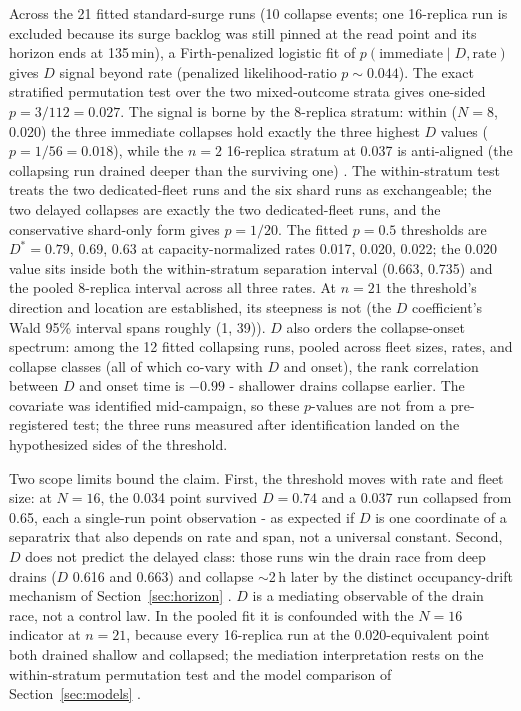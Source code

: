 Across the 21 fitted standard-surge runs (10 collapse events; one
16-replica run is excluded because its surge backlog was still
pinned at the read point and its horizon ends at 135\,min), a
Firth-penalized logistic fit of $p(\text{immediate} \mid D, \text{rate})$ gives $D$
signal beyond rate (penalized likelihood-ratio $p \sim 0.044$). The exact
stratified permutation test over the two mixed-outcome strata gives
one-sided $p = 3/112 = 0.027$. The signal is borne by the 8-replica
stratum: within ($N{=}8$, 0.020) the three immediate collapses hold
exactly the three highest $D$ values ($p = 1/56 = 0.018$), while the
$n=2$ 16-replica stratum at 0.037 is anti-aligned (the collapsing run
drained deeper than the surviving one) 
. The within-stratum
test treats the two dedicated-fleet runs and the six shard runs as
exchangeable; the two delayed collapses are exactly the two
dedicated-fleet runs, and the conservative shard-only form gives
$p = 1/20$. The fitted $p{=}0.5$ thresholds are $D^* = 0.79$, 0.69, 0.63 at
capacity-normalized rates 0.017, 0.020, 0.022; the 0.020 value sits
inside both the within-stratum separation interval (0.663, 0.735)
and the pooled 8-replica interval across all three rates. At $n=21$
the threshold's direction and location are established, its
steepness is not (the $D$ coefficient's Wald 95\% interval spans
roughly (1, 39)). $D$ also orders the collapse-onset spectrum: among
the 12 fitted collapsing runs, pooled across fleet sizes, rates, and
collapse classes (all of which co-vary with $D$ and onset), the rank
correlation between $D$ and onset time is $-0.99$ - shallower drains
collapse earlier. The covariate was identified mid-campaign, so
these $p$-values are not from a pre-registered test; the three runs
measured after identification landed on the hypothesized sides of
the threshold.

Two scope limits bound the claim. First, the threshold moves with
rate and fleet size: at $N{=}16$, the 0.034 point survived $D = 0.74$ and
a 0.037 run collapsed from 0.65, each a single-run point observation
 - as expected if $D$ is one coordinate of a separatrix that
also depends on rate and span, not a universal constant. Second, $D$
does not predict the delayed class: those runs win the drain race
from deep drains ($D$ 0.616 and 0.663) and collapse $\sim$2\,h later by the
distinct occupancy-drift mechanism of Section~\ref{sec:horizon} . $D$ is a
mediating observable of the drain race, not a control law. In the
pooled fit it is confounded with the $N{=}16$ indicator at $n=21$, because
every 16-replica run at the 0.020-equivalent point both drained
shallow and collapsed; the mediation interpretation rests on the
within-stratum permutation test and the model comparison of
Section~\ref{sec:models} .


